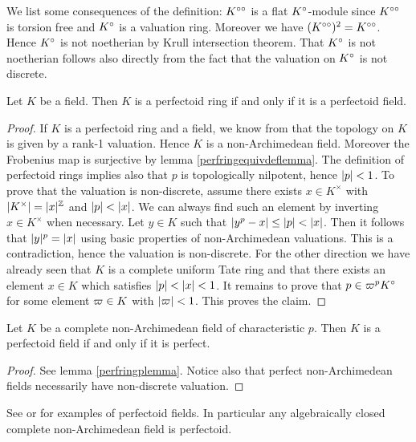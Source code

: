 We list some consequences of the definition:
$K^{\circ\circ}$ is a flat $K{^{\circ}}$-module since $K^{\circ\circ}$  is torsion free and $K{^{\circ}}$ is a valuation ring. Moreover we have $(K^{\circ\circ})^2=K^{\circ\circ}$. Hence $K{^{\circ}}$ is not noetherian by Krull intersection theorem. That $K{^{\circ}}$ is not noetherian follows also directly from the fact that the valuation on $K{^{\circ}}$ is not discrete. 




\begin{prop}
Let $K$ be a field. Then $K$ is a perfectoid ring if and only if it is a perfectoid field.
\end{prop}
\begin{proof}
If $K$ is a perfectoid ring and a field, we know from \cite[theorem 4.2]{Kedlaya19} that the topology on $K$ is given by a rank-1 valuation. Hence $K$ is a non-Archimedean field. Moreover the Frobenius map is surjective by lemma \ref{perfringequivdeflemma}. The definition of perfectoid rings implies also that $p$ is topologically nilpotent, hence 
$\lvert p\rvert<1$. To prove that the valuation is non-discrete, assume there exists $x\in K^\times$ with $\lvert K^\times\rvert=\lvert x\rvert^{\mathbb{Z}}$ and
$\lvert p\rvert<\lvert x\rvert$. We can always find such an element by inverting $x\in K^\times$ when necessary.  Let $y\in K$ such that $\lvert y^p-x\rvert\leq\lvert p\rvert<\lvert x\rvert$. 
Then it follows that $\lvert y\rvert^p=\lvert x\rvert$ using basic properties of non-Archimedean valuations. This is a contradiction, hence the valuation is non-discrete.
For the other direction we have already seen that $K$ is a complete uniform Tate ring and that there exists an element  $x\in K$ which satisfies
$\lvert p\rvert<\lvert x\rvert<1$. It remains to prove that $p\in\varpi^{p}K{^{\circ}}$ for some element $\varpi\in K$ with $\lvert\varpi\rvert<1$. This proves the claim.
\end{proof}


\begin{lemma}
Let $K$ be a complete non-Archimedean field of characteristic $p$.
Then $K$ is a perfectoid field if and only if it is perfect.
\end{lemma}
\begin{proof}
See lemma \ref{perfringplemma}. Notice also that perfect non-Archimedean fields necessarily have non-discrete valuation.
\end{proof}


See \cite[example 3.4]{Scholzeetcoh21} or \cite[example V.1.1.11]{Morel19}  for examples of perfectoid fields.
In particular any algebraically closed complete non-Archimedean field is perfectoid.\\

